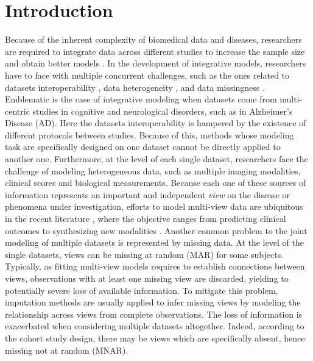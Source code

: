 \section{Introduction}

Because of the inherent complexity of biomedical data and diseases,
researchers are required to integrate data across different studies to increase the sample size and obtain better models \citep{LeSueur2020}.
%
In the development of integrative models, researchers have to face with multiple concurrent challenges, such as the ones related to
datasets interoperability \citep{Tognin2020},
data heterogeneity \citep{Buch2020},
and data missingness \citep{GolrizKhatami2020}.
%
Emblematic is the case of integrative modeling when datasets come from multi-centric studies in cognitive and neurological disorders,
such as in Alzheimer's Disease (AD).
%
Here the datasets interoperability is hampered by the existence of different protocols between studies.
Because of this, methods whose modeling task are specifically designed on one dataset cannot be directly applied to another one.
Furthermore, at the level of each single dataset, researchers face the challenge of modeling heterogeneous data,
such as multiple imaging modalities, clinical scores and biological measurements.
Because each one of these sources of information represents an important and independent \textit{view} on the disease or phenomena under investigation,
efforts to model multi-view data are ubiquitous in the recent literature \citep{Vieira2020,Venugopalan2021},
where the objective ranges from predicting clinical outcomes \citep{Chen2019,AbiNader2020,Tabarestani2020}
to synthesizing new modalities \citep{Zhou2020, Wei2019}.
%
Another common problem to the joint modeling of multiple datasets is represented by missing data.
At the level of the single datasets, views can be missing at random (MAR) for some subjects.
Typically, as fitting multi-view models requires to establish connections between views, observations with at least one missing view are discarded, yielding to potentially severe loss of available information.
To mitigate this problem, imputation methods are usually applied to infer missing views by modeling the relationship across views from complete observations.
%
The loss of information is exacerbated when considering multiple datasets altogether.
Indeed, according to the cohort study design, there may be views which are specifically absent, hence missing not at random (MNAR).
